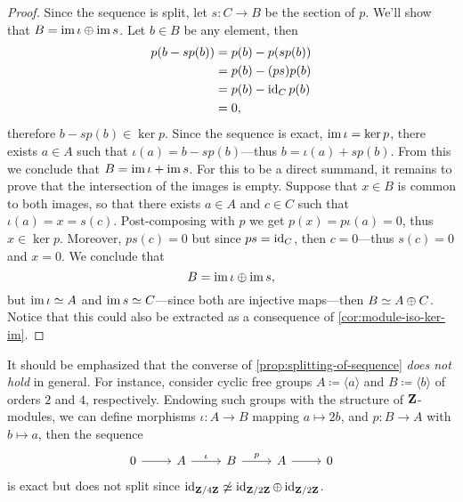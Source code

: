 \begin{proof}
    Since the sequence is split, let \(s: C \to B\) be the section of \(p\). We'll
    show that \(B = \operatorname{im} \iota \oplus \operatorname{im} s\). Let \(b \in B\) be any element, then
    \begin{align*}
        p(b - sp(b))
         & = p(b) - p (s p(b)) \\
         & = p(b) - (p s) p(b) \\
         & = p(b) - \operatorname{id}_C p(b) \\
         & = 0,
    \end{align*}
    therefore \(b - s p(b) \in \ker p\). Since the sequence is exact,
    \(\operatorname{im} \iota = \ker p\), there exists \(a \in A\) such that
    \(\iota(a) = b - s p(b)\)---thus \(b = \iota(a) + s p(b)\). From this we
    conclude that \(B = \operatorname{im} \iota + \operatorname{im} s\). For this to be a direct summand, it
    remains to prove that the intersection of the images is empty. Suppose that
    \(x \in B\) is common to both images, so that there exists \(a \in A\) and
    \(c \in C\) such that \(\iota(a) = x = s(c)\). Post-composing with \(p\) we get
    \(p(x) = p \iota(a) = 0\), thus \(x \in \ker p\). Moreover, \(p s(c) = 0\) but
    since \(p s = \operatorname{id}_C\), then \(c = 0\)---thus \(s(c) = 0\) and \(x = 0\). We
    conclude that
    \[
        B = \operatorname{im} \iota \oplus \operatorname{im} s,
    \]
    but \(\operatorname{im} \iota \simeq A\) and \(\operatorname{im} s \simeq C\)---since both are injective
    maps---then \(B \simeq A \oplus C\). Notice that this could also be extracted as a
    consequence of \cref{cor:module-iso-ker-im}.
\end{proof}

\begin{remark}
    \label{rem:converse-of-splitting-sequence-is-false}
    It should be emphasized that the converse of \cref{prop:splitting-of-sequence}
    \emph{does not hold} in general.  For instance, consider cyclic free groups
    \(A \coloneq \langle a \rangle\) and \(B \coloneq \langle b \rangle\) of orders
    \(2\) and \(4\), respectively. Endowing such groups with the structure of
    \(\mathbf{Z}\)-modules, we can define morphisms \(\iota: A \to B\) mapping
    \(a \mapsto 2 b\), and \(p: B \to A\) with \(b \mapsto a\), then the sequence
    \[
        \begin{tikzcd}
            0 \ar[r]
            &A \ar[r, "\iota"]
            &B \ar[r, "p"]
            &A \ar[r]
            &0
        \end{tikzcd}
    \]
    is exact but does not split since
    \(\operatorname{id}_{\mathbf{Z}/4\mathbf{Z}} \not\simeq \operatorname{id}_{\mathbf{Z}/2\mathbf{Z}} \oplus \operatorname{id}_{\mathbf{Z}/2\mathbf{Z}}\).
\end{remark}

